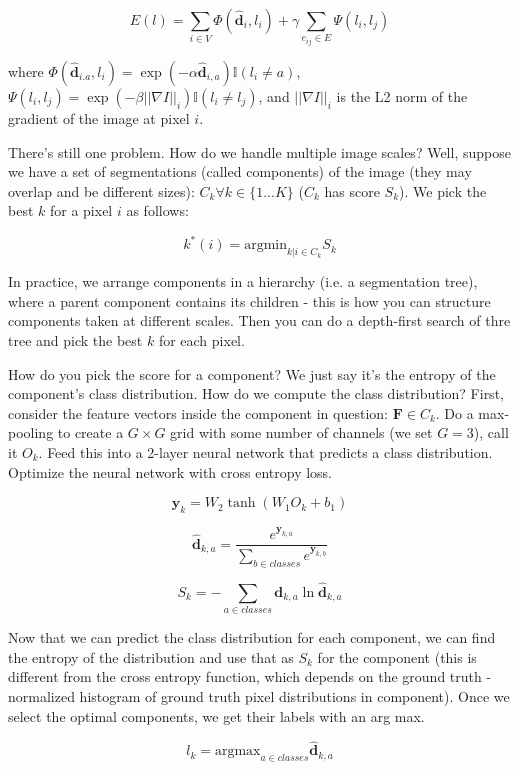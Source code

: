 \documentclass[a4paper]{article}
\begin{document}
$$
E(l) = \sum_{i \in V}{\Phi(\hat{\mathbf{d}}_i, l_i)} +
\gamma \sum_{e_{ij} \in E}{\Psi(l_i, l_j)}
$$

where $\Phi(\hat{\mathbf{d}}_{i. a}, l_i) = \exp(-\alpha \hat{\mathbf{d}}_{i, a}
) \mathbb{I}(l_i \ne a)$, $\Psi(l_i, l_j) = \exp(-\beta ||\nabla I||_i)
\mathbb{I}(l_i \ne l_j)$, and $||\nabla I||_i$ is the L2 norm of the gradient of
the image at pixel $i$.

There's still one problem. How do we handle multiple image scales? Well, suppose
we have a set of segmentations (called components) of the image (they may
overlap and be different sizes): $C_k \forall k \in \{1...K\}$ ($C_k$ has
score $S_k$). We pick the best $k$ for a pixel $i$ as follows:

$$
k^*(i) = \textrm{argmin}_{k | i \in C_k}{S_k}
$$

In practice, we arrange components in a hierarchy (i.e. a segmentation tree),
where a parent component contains its children - this is how you can structure
components taken at different scales. Then you can do a depth-first search of
thre tree and pick the best $k$ for each pixel.

How do you pick the score for a component? We just say it's the entropy of
the component's class distribution. How do we compute the class distribution?
First, consider the feature vectors inside the component in question: $
\mathbf{F} \in C_k$. Do a max-pooling to create a $G \times G$ grid with some
number of channels (we set $G = 3$), call it $O_k$. Feed this into a 2-layer
neural network that predicts a class distribution. Optimize the neural network
with cross entropy loss.

$$
\mathbf{y}_k = W_2 \tanh(W_1 O_k + b_1)
$$

$$
\hat{\mathbf{d}}_{k, a} = \frac{e^{\mathbf{y}_{k, a}}}{
\sum_{b \in classes}{e^{\mathbf{y}_{k, b}}}
}
$$

$$
S_k = - \sum_{a \in classes}{\mathbf{d}_{k, a} \ln \hat{\mathbf{d}}_{k, a}}
$$

Now that we can predict the class distribution for each component, we can find
the entropy of the distribution and use that as $S_k$ for the component (this
is different from the cross entropy function, which depends on the ground
truth - normalized histogram of ground truth pixel distributions in component).
Once we select the optimal components, we get their labels with an arg max.

$$
l_k = \textrm{argmax}_{a \in classes}{\hat{\mathbf{d}}_{k, a}}
$$
\end{document}

